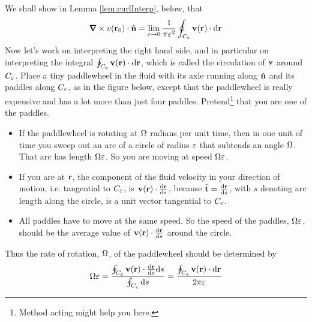 We shall show in Lemma \ref{lem:curlInterp}, below, that
\begin{equation*}%
\vnabla\times v(\vr_0)\cdot \hn
=\lim_{\veps\rightarrow 0}\frac{1}{\pi\veps^2}
         \oint_{C_\veps} \vv(\vr)\cdot \dee{\vr}
\end{equation*}
Now let's work on interpreting the right hand side, and in particular
on interpreting the integral $\oint_{C_\varepsilon} \mathbf{v}(\mathbf{r})\cdot \mathrm{d}\mathbf{r}$,
which is called the circulation of $\mathbf{v}$ around $C_\varepsilon$.
Place a tiny paddlewheel in the fluid with its axle running along $\hat{\mathbf{n}}$
and its paddles along $C_\varepsilon$, as in the figure below, except that
the paddlewheel is really expensive and has a lot more than just four
paddles. Pretend\footnote{Method acting might help you here.} that you are one of the paddles. 
\begin{itemize}
\item
If the paddlewheel is rotating at $\Omega$ radians per unit time, then in one 
unit of time you sweep out an arc of a circle of radius $\varepsilon$ that subtends 
an angle $\Omega$. That arc has length $\Omega\varepsilon$. So you are moving at speed 
$\Omega \varepsilon$. 
\item
If you are at $\mathbf{r}$, the component of the fluid velocity in your direction of motion, i.e. tangential to $C_\varepsilon$, is $\vv(\vr)\cdot\diff{\vr}{s}$,
because $\hvt=\diff{\vr}{s}$, with $s$ denoting arc length along the circle, 
is a unit vector tangential to $C_\varepsilon$. 
\item
All paddles have to move at the same speed. So the speed of the 
paddles, $\Omega\varepsilon$, should be the average value of $\vv(\vr)\cdot\diff{\vr}{s}$ around the circle.
\end{itemize}
Thus the rate of rotation, $\Omega$, of the  paddlewheel should be
determined by
\begin{align*}
\Om \veps 
&= \frac{\oint_{C_\veps} \vv(\vr)\cdot\diff{\vr}{s}\dee{s}}
              {\oint_{C_\veps}\dee{s}} 
= \frac{\oint_{C_\veps} \vv(\vr)\cdot\dee{\vr}}
              {2\pi\veps} \\
\end{align*}
